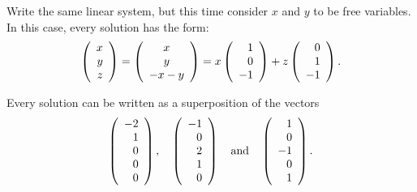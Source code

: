 \documentclass{ximera}
\begin{document}
\soln Write the same linear system, but this time consider $x$ and $y$
to be free variables.  In this case, every solution has the form:
\[
\left(\begin{array}{r} x \\ y \\ z\end{array}\right) = \left(\begin{array}{c} x \\ y \\
-x - y \end{array}\right) = x\left(\begin{array}{r} 1 \\ 0 \\ -1\end{array}\right) +
z\left(\begin{array}{r} 0 \\ 1 \\ -1\end{array}\right).
\]

\ans Every solution can be written as a superposition of the vectors
\[
\left(\begin{array}{r} -2 \\ 1 \\ 0 \\ 0 \\ 0\end{array}\right), \quad
\left(\begin{array}{r} -1 \\ 0 \\ 2 \\ 1 \\ 0 \end{array}\right) \quad\mbox{and}\quad
\left(\begin{array}{r} 1 \\ 0 \\ -1 \\ 0 \\ 1 \end{array}\right).
\]
\end{document}
